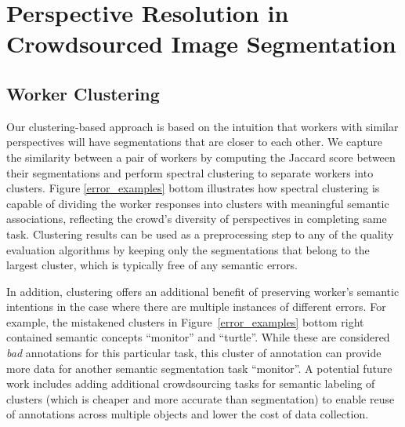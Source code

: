 \section{Perspective Resolution in Crowdsourced Image Segmentation}
\subsection{Worker Clustering}
Our clustering-based approach is based on the intuition that workers with similar perspectives  will have segmentations that are closer to each other. We capture the similarity between a pair of workers by computing the Jaccard score between their segmentations and perform spectral clustering to separate workers into clusters. Figure \ref{error_examples} bottom illustrates how spectral clustering is capable of dividing the worker responses into clusters with meaningful semantic associations, reflecting the crowd's diversity of perspectives in completing same task. Clustering results can be used as a preprocessing step to any of the quality evaluation algorithms by keeping only the segmentations that belong to the largest cluster, which is typically free of any semantic errors.
\par In addition, clustering offers an additional benefit of preserving worker's semantic intentions in the case where there are multiple instances of different errors. For example, the mistakened clusters in Figure~\ref{error_examples} bottom right contained semantic concepts ``monitor'' and ``turtle''. While these are considered \textit{bad} annotations for this particular task, this cluster of annotation can provide more data for another semantic segmentation task ``monitor''. A potential future work includes adding additional crowdsourcing tasks for semantic labeling of clusters (which is cheaper and more accurate than segmentation) to enable reuse of annotations across multiple objects and lower the cost of data collection. 
